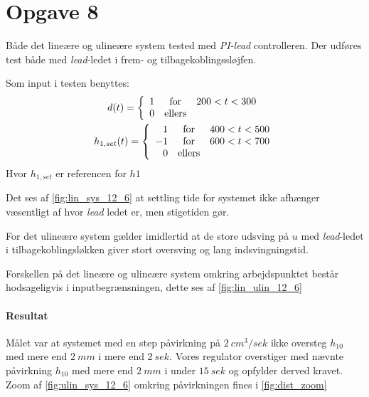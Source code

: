 \section{Opgave 8}
Både det lineære og ulineære system tested med \emph{PI-lead} controlleren.
Der udføres test både med \emph{lead}-ledet i frem- og tilbagekoblingssløjfen.

Som input i testen benyttes:
\begin{gather*}
d(t) = \left\{\begin{array}{r c l}
1 & \mbox{for} & 200<t<300\\
0 & \mbox{ellers} & 
\end{array}\right.\\
h_{1, set}(t) = \left\{\begin{array}{r c l}
 1 & \mbox{for} & 400<t<500\\
-1 & \mbox{for} & 600<t<700\\
 0 & \mbox{ellers} & 
\end{array}\right.\\
\end{gather*}
Hvor $h_{1, set}$ er referencen for $h1$

Det ses af \ref{fig:lin_sys_12_6} at settling tide for systemet ikke afhænger
væsentligt af hvor \emph{lead} ledet er, men stigetiden gør.

For det ulineære system gælder imidlertid at de store udsving på $u$ med
\emph{lead}-ledet i tilbagekoblingsløkken giver stort oversving og lang
indsvingningstid.

Forskellen på det lineære og ulineære system omkring arbejdspunktet består
hodsageligvis i inputbegrænsningen, dette ses af \ref{fig:lin_ulin_12_6}

\paragraph{Resultat}
	Målet var at systemet med en step påvirkning på $2~cm^3/sek$ ikke oversteg
	$h_{10}$ med mere end $2~mm$ i mere end $2~sek$. Vores regulator overstiger med nævnte
	påvirkning $h_{10}$ med mere end $2~mm$ i under $15~sek$ og opfylder derved
	kravet. Zoom af \ref{fig:ulin_sys_12_6} omkring påvirkningen fines i
	\ref{fig:dist_zoom}




